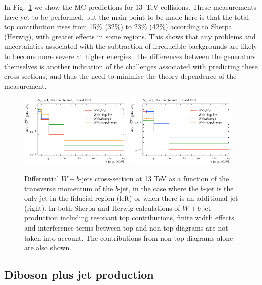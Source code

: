 \documentclass[11pt]{cernrep}
\begin{document}
In Fig.~\ref{fig:13tev} we show the MC predictions for 13~TeV collisions. These measurements have yet to be
performed, but the main point to be made here is that the total top contribution rises from 15\% (32\%)
to 23\% (42\%) according to Sherpa (Herwig), with greater effects in some regions.  This shows that any
problems and uncertainties associated with the subtraction of irreducible backgrounds are likely to become
more severe at higher energies. The differences between the generators themselves is another indication of the 
challenges associated with predicting these cross sections, and thus the need to minimise the theory
dependence of the measurement.
  
\begin{figure}
\centering
	\includegraphics[width=0.48\textwidth]{13tev-1jet.pdf}
	\includegraphics[width=0.48\textwidth]{13tev-2jet.pdf}
\caption{\label{fig:13tev}
  Differential $W+b$-jets cross-section at 13 TeV as a function of the
  transverse momentum of the $b$-jet, in the case where the $b$-jet is the only jet in the fiducial region
  (left) or when there is an additional jet (right). In both Sherpa and Herwig
  calculations of $W+b$-jet production including resonant top contributions, finite width effects 
  and interference terms between top and non-top diagrams are not
  taken into account. The contributions from non-top diagrams alone are also shown.}
\end{figure}

\subsection{Diboson plus jet production}
\end{document}
